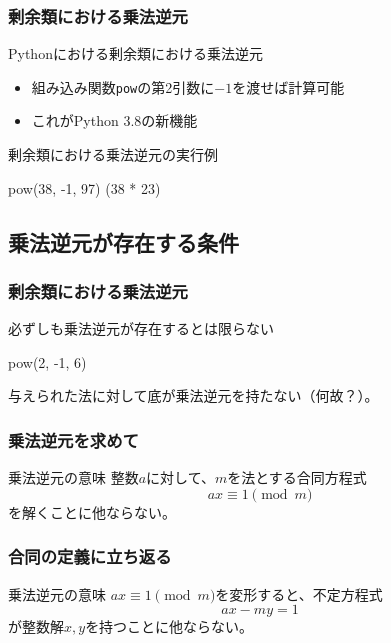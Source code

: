 \documentclass[aspectratio=169,dvipdfmx,14pt,notheorems]{beamer}
\theoremstyle{definition}
\begin{document}
\begin{frame}[fragile]\frametitle{剰余類における乗法逆元}

\begin{block}{Pythonにおける剰余類における乗法逆元}
\begin{itemize}
\item 組み込み関数\texttt{pow}の第2引数に$-1$を渡せば計算可能
\item これがPython 3.8の新機能
\end{itemize}
\end{block}

\begin{exampleblock}{剰余類における乗法逆元の実行例}

\begin{pyconsole}
pow(38, -1, 97)
(38 * 23) %
\end{pyconsole}

\end{exampleblock}

\end{frame}

\subsection{乗法逆元が存在する条件}

\begin{frame}[fragile]\frametitle{剰余類における乗法逆元}

\begin{alertblock}{必ずしも乗法逆元が存在するとは限らない}

\begin{pyconsole}
pow(2, -1, 6)
\end{pyconsole}
\end{alertblock}
与えられた法に対して底が乗法逆元を持たない（何故？）。
\end{frame}

\begin{frame}[fragile]\frametitle{乗法逆元を求めて}

\begin{block}{乗法逆元の意味}
整数$a$に対して、$m$を法とする合同方程式
\begin{equation*}
ax \equiv 1 \pmod{m}
\end{equation*}
を解くことに他ならない。
\end{block}

\end{frame}

\begin{frame}[fragile]\frametitle{合同の定義に立ち返る}

\begin{block}{乗法逆元の意味}
$ax \equiv 1 \pmod{m}$を変形すると、不定方程式
\begin{equation*}
ax -my = 1
\end{equation*}
が整数解$x, y$を持つことに他ならない。
\end{block}

\end{frame}
\end{document}
